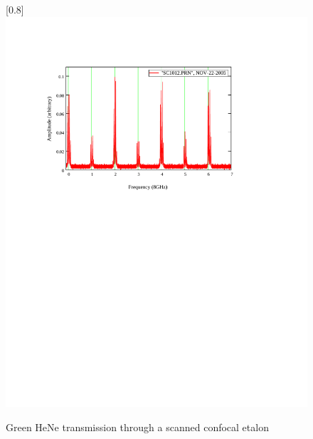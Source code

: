 \begin{figure}
\scalebox{0.8}[0.8]{
\includegraphics[bb=15 440 489 752]
{confocal_all/confocal_all.pdf}
}
\caption[Green HeNe transmission through a scanned confocal etalon]{Green HeNe transmission through a scanned confocal etalon}
\label{confocal_all}
\end{figure}
